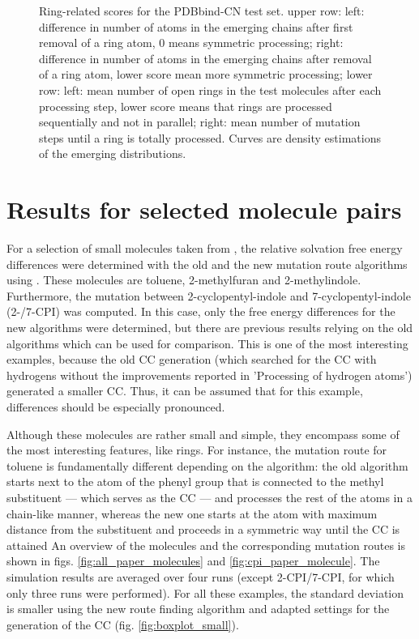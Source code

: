 \begin{figure}
	\caption{Ring-related scores for the PDBbind-CN test set. upper row: left: difference in number of atoms in the emerging chains after first removal of a ring atom, 0 means symmetric processing; right: difference in number of atoms in the emerging chains after removal of a ring atom, lower score mean more symmetric processing; lower row: left: mean number of open rings in the test molecules after each processing step, lower score means that rings are processed sequentially and not in parallel; right: mean number of mutation steps until a ring is totally processed. Curves are density estimations of the emerging distributions.}
	
\end{figure}



\section{Results for selected molecule pairs}

For a selection of small molecules taken from \cite{Loeffler.2018, Wieder.2022}, the relative solvation free energy differences were determined with the old and the new mutation route algorithms  using {\trafo}. These molecules are toluene, 2-methylfuran and 2-methylindole.
Furthermore, the mutation between 2-cyclopentyl-indole and 7-cyclopentyl-indole (2-/7-CPI) was computed. In this case, only the free energy differences for the new algorithms were determined, but there are previous results relying on the old algorithms which can be used for comparison. This is one of the most interesting examples, because the old CC generation (which searched for the CC with hydrogens without the improvements reported in 'Processing of hydrogen atoms') generated a smaller CC. Thus, it can be assumed that for this example, differences should be especially pronounced.

Although these molecules are rather small and simple, they encompass some of the most interesting features, like rings. For instance, the mutation route for toluene is fundamentally different depending on the algorithm: the old algorithm starts next to the atom of the phenyl group that is connected to the methyl substituent --- which serves as the CC --- and processes the rest of the atoms in a chain-like manner, whereas the new one starts at the atom with maximum distance from the substituent and proceeds in a symmetric way until the CC is attained
An overview of the molecules and the corresponding mutation routes is shown in figs. \ref{fig:all_paper_molecules} and \ref{fig:cpi_paper_molecule}.
The simulation results are averaged over four runs (except 2-CPI/7-CPI, for which only three runs were performed). 
For all these examples, the standard deviation is smaller using the new route finding algorithm and adapted settings for the generation of the CC (fig. \ref{fig:boxplot_small}).


